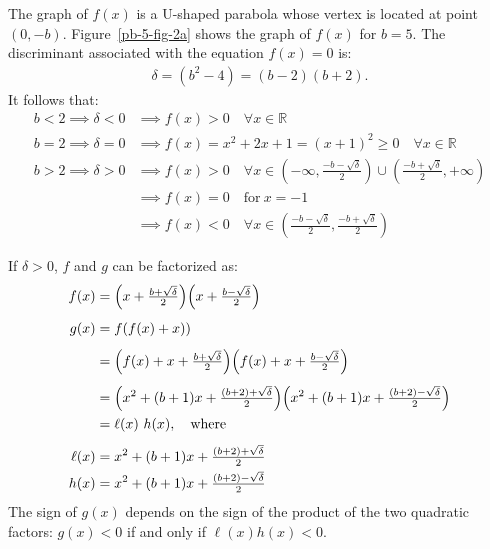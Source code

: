 The graph of $f(x)$ is a U-shaped parabola whose vertex is located at point $(0,-b)$. Figure~\ref{pb-5-fig-2a} shows the graph of $f(x)$ for $b=5$. The discriminant associated with the equation $f(x)=0$ is: 
\begin{align*}
\delta = (b^{2}-4)=(b-2)(b+2). 
\end{align*}
It follows that:
\begin{align*}
b < 2 \implies \delta < 0 
     &\implies f(x) > 0 \quad \forall x \in \mathbb{R}
\\
b = 2 \implies \delta = 0 
     &\implies f(x) = x^{2} + 2x + 1 = (x+1)^{2} \ge 0 \quad \forall x \in \mathbb{R}
\\
b > 2 \implies \delta > 0 
     &\implies f(x) > 0 \quad \forall x \in (-\infty, \tfrac{-b-\sqrt{\delta}}{2}) \cup (\tfrac{-b+\sqrt{\delta}}{2}, +\infty)
\\
     &\implies f(x) = 0 \quad \text{for}~ x = -1
\\
     &\implies f(x) < 0 \quad \forall x \in (\tfrac{-b-\sqrt{\delta}}{2}, \tfrac{-b+\sqrt{\delta}}{2})
\end{align*}

If $\delta>0$, $f$ and $g$ can be factorized as:
\begin{align*}
f(x) 
& = \Bigl(x+\tfrac{b+\sqrt{\delta}}{2}\Bigr)\Bigl(x+\tfrac{b-\sqrt{\delta}}{2}\Bigr)
\\[1ex]
g(x) 
& = f(f(x)+x))
\\[1ex]
& = \Bigl(f(x)+x+\tfrac{b+\sqrt{\delta}}{2}\Bigr) 
    \Bigl(f(x)+x+\tfrac{b-\sqrt{\delta}}{2}\Bigr)
\\[1ex]
& = \Bigl(x^{2}+(b+1)x + \tfrac{(b+2) + \sqrt{\delta}}{2}\Bigr) 
    \Bigl(x^{2}+(b+1)x + \tfrac{(b+2) - \sqrt{\delta}}{2}\Bigr)
\\
& = \ell(x) \ h(x), \quad \text{where}
\\[1ex]
\ell(x) 
  & = x^{2}+(b+1)x+\tfrac{(b+2)+\sqrt{\delta}}{2}
\\
h(x) 
  & = x^{2}+(b+1)x+\tfrac{(b+2)-\sqrt{\delta}}{2}
\end{align*}
The sign of $g(x)$ depends on the sign of the product of the two quadratic factors: $g(x)<0$ if and only if $\ell(x)h(x)<0$. 

